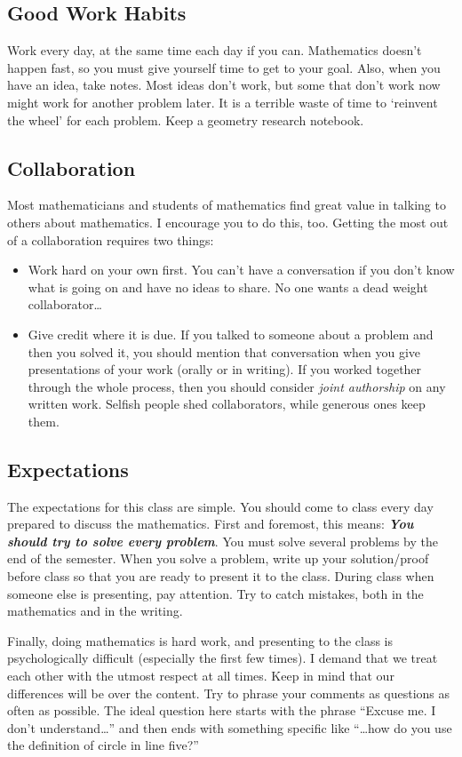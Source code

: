 \documentclass{tufte-handout}
\theoremstyle{definition}
\begin{document}
\subsection*{Good Work Habits} Work every day, at the same time each day if you can. Mathematics doesn't happen fast, so you must give yourself time to get to your goal. Also, when you have an idea, take notes. Most ideas don't work, but some that don't work now might work for another problem later. It is a terrible waste of time to `reinvent the wheel' for each problem. Keep a geometry research notebook.

\subsection*{Collaboration} Most mathematicians and students of mathematics find great value in talking to others about mathematics. I encourage you to do this, too. Getting the most out of a collaboration requires two things:
\begin{itemize}
\item Work hard on your own first. You can't have a conversation if you don't know what is going on and have no ideas to share. No one wants a dead weight collaborator\dots
\item Give credit where it is due. If you talked to someone about a problem and then you solved it, you should mention that conversation when you give presentations of your work (orally or in writing). If you worked together through the whole process, then you should consider \emph{joint authorship} on any written work. Selfish people shed collaborators, while generous ones keep them.
\end{itemize}


\subsection*{Expectations} 
The expectations for this class are simple. You should come to class every day prepared to discuss the mathematics. First and foremost, this means:
\textbf{\emph{You should try to solve every problem}}.
You must solve several problems by the end of the semester. When you solve a problem, write up your solution/proof before class so that you are ready to present it to the class. During class when someone else is presenting, pay attention. Try to catch  mistakes, both in the mathematics and in the writing. 

Finally, doing mathematics is hard work, and presenting to the class is psychologically difficult (especially the first few times). I demand that we treat each other with the utmost respect at all times. Keep in mind that our differences will be over the content. Try to phrase your comments as questions as often as possible. The ideal question here starts with the phrase ``Excuse me. I don't understand\dots'' and then ends with something specific like ``\dots how do you use the definition of circle in line five?''
\end{document}
